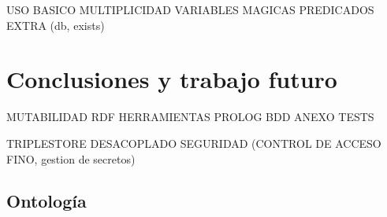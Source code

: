 \documentclass[12pt]{report} %
\begin{document}
USO BASICO
MULTIPLICIDAD
VARIABLES MAGICAS
PREDICADOS EXTRA (db, exists)

\chapter{Conclusiones y trabajo futuro}

MUTABILIDAD RDF
HERRAMIENTAS PROLOG
BDD
ANEXO TESTS

TRIPLESTORE DESACOPLADO
SEGURIDAD (CONTROL DE ACCESO FINO, gestion de secretos)


\begin{appendices}
\chapter{Ontología}

\end{appendices}



\end{document}
